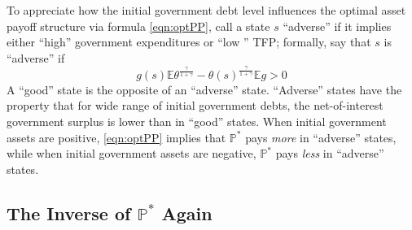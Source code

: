\documentclass[12pt]{article}
\newcommand{\EE}{\mathbb E}
\begin{document}
To appreciate how  the initial government debt level influences the optimal asset payoff structure via formula \eqref{eqn:optPP}, call a
 state $s$ ``adverse''  if it implies either ``high'' government expenditures or ``low '' TFP; formally, say that  $s$ is ``adverse'' if
\[   g(s)\EE \theta^\frac{\gamma}{1+\gamma}-\theta(s)^\frac\gamma{1+\gamma}\EE g >0\]
A ``good'' state is the opposite of an ``adverse'' state.  ``Adverse'' states have the property that for  wide range of initial government debts, the net-of-interest government surplus is lower than in ``good'' states.  When initial government assets are positive, \eqref{eqn:optPP} implies that  $\mathbb{P}^*$   pays {\em more} in ``adverse'' states, while when initial government assets are negative, $\mathbb{P}^*$  pays {\em less} in ``adverse'' states.

%
%
%
%

\subsection{The Inverse of $\mathbb P^*$ Again}\label{sec:David42} %
\end{document}
